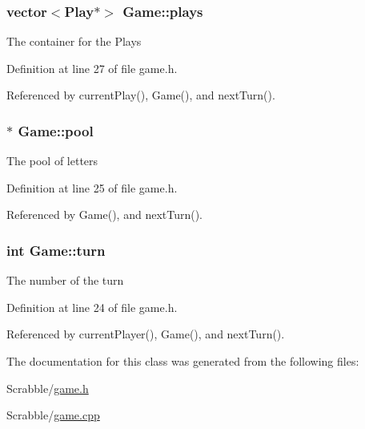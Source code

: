 \hypertarget{class_game_a358b65cc87708ae0fe5793bae968971f}{
\subsubsection[{plays}]{\setlength{\rightskip}{0pt plus 5cm}vector$<${\bf Play}$\ast$$>$ Game\-::plays\hspace{0.3cm}{\ttfamily [private]}}}\label{class_game_a358b65cc87708ae0fe5793bae968971f}
The container for the Plays 

Definition at line 27 of file game.\-h.



Referenced by current\-Play(), Game(), and next\-Turn().

\hypertarget{class_game_ae3b2cb6cd3fd8cf83dc8cd8a6068487a}{
\subsubsection[{pool}]{$\ast$ Game\-::pool\hspace{0.3cm}{\ttfamily [private]}}}\label{class_game_ae3b2cb6cd3fd8cf83dc8cd8a6068487a}
The pool of letters 

Definition at line 25 of file game.\-h.



Referenced by Game(), and next\-Turn().

\hypertarget{class_game_aef6ba37517324fc3469dfa65d6f92d21}{
\subsubsection[{turn}]{\setlength{\rightskip}{0pt plus 5cm}int Game\-::turn\hspace{0.3cm}{\ttfamily [private]}}}\label{class_game_aef6ba37517324fc3469dfa65d6f92d21}
The number of the turn 

Definition at line 24 of file game.\-h.



Referenced by current\-Player(), Game(), and next\-Turn().



The documentation for this class was generated from the following files\-:\begin{DoxyCompactItemize}
\item 
Scrabble/\hyperlink{game_8h}{game.\-h}\item 
Scrabble/\hyperlink{game_8cpp}{game.\-cpp}\end{DoxyCompactItemize}
